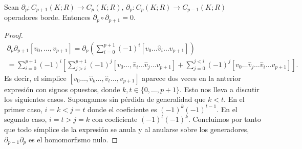 \begin{lema}
	Sean $\partial_p : C_{p+1}(K;R) \to C_{p}(K;R)$, $\partial_{p} : C_{p}(K;R) \to C_{p-1}(K;R)$ operadores borde. Entonces \(\partial_{p} \circ \partial_{p+1} = 0\).
\end{lema}
\begin{proof}
	\begin{gather*}
	\partial_{p} \partial_{p+1}[v_0, \ldots, v_{p+1}] = \partial_{p} \left( \sum_{i=0}^{p+1} (-1)^i[v_0 \dots \hat{v}_i \dots v_{p+1}] \right) \\
	= \sum_{i=0}^{p+1} (-1)^i \left[ \sum_{j>i}^{p+1} (-1)^{j}[v_0 \dots, \hat{v}_i \dots \hat{v}_j \ldots v_{p+1}]
	+ \sum_{j=0}^{j<i} (-1)^j[v_0 \ldots \hat{v}_j \ldots \hat{v}_i \ldots v_{p+1}] \right].
	\end{gather*}
	Es decir, el símplice $[v_0\dots,\hat{v}_k\dots,\hat{v}_t \dots, v_{p+1}]$ aparece dos veces en la anterior expresión con signos opuestos, donde $k,t \in \{0, \dots, p+1\}$. Esto nos lleva a discutir los siguientes casos. Supongamos sin pérdida de generalidad que $k < t$. En el primer caso, $i = k < j = t$ donde el coeficiente es $(-1)^k(-1)^{t-1}$. En el segundo caso, $i = t > j = k$ con coeficiente $(-1)^t(-1)^k$. Concluimos por tanto que todo símplice de la expresión se anula y al anularse sobre los generadores, $\partial_{p-1} \partial_p$ es el homomorfismo nulo.
\end{proof}

